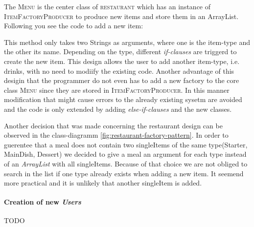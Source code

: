 The \textsc{Menu} is the center class of \textsc{restaurant} which has an instance of 
\textsc{ItemFactoryProducer} to produce new items and store them in an ArrayList. Following you see
the code to add a new item:



This method only takes two Strings as arguments, where one is the item-type and the other its name.
Depending on the type, different \textit{if-clauses} are triggerd to create the new item. This 
design allows the user to add another item-type, i.e. drinks, with no need to modiify the existing 
code. Another advantage of this desigin that the programmer do not even has to add a new factory to
the core class \textsc{Menu} since they are stored in \textsc{ItemFactoryProducer}. In this manner
modification that might cause errors to the already existing sysetm are avoided and the code is 
only extended by adding \textit{else-if-clauses} and the new classes. 

Another decision that was made concerning the restaurant design can be observed in the
class-diagramm \ref{fig:restaurant-factory-pattern}. In order to guerentee that a meal does not
contain two singleItems of the same type(Starter, MainDish, Dessert) we decided to give a meal an
argument for each type instead of an \textit{ArrayList} with all singleItems. Because of that choice
we are not obliged to search in the list if one type already exists when adding a new item. It 
seemend more practical and it is unlikely that another singleItem is added.

\paragraph{Creation of new \textit{Users}}

TODO


